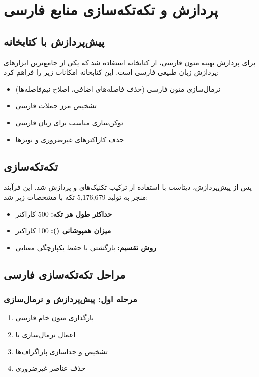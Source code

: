 \documentclass[11pt, a4paper, oneside]{book}
\begin{document}
	\section{پردازش و تکه‌تکه‌سازی منابع فارسی}

	\subsection{پیش‌پردازش با کتابخانه }
	برای پردازش بهینه متون فارسی، از کتابخانه  استفاده شد که یکی از جامع‌ترین ابزارهای پردازش زبان طبیعی فارسی است. این کتابخانه امکانات زیر را فراهم کرد:

	\begin{itemize}
		\item نرمال‌سازی متون فارسی (حذف فاصله‌های اضافی، اصلاح نیم‌فاصله‌ها)
		\item تشخیص مرز جملات فارسی
		\item توکن‌سازی مناسب برای زبان فارسی
		\item حذف کاراکترهای غیرضروری و نویزها
	\end{itemize}

	\subsection{تکه‌تکه‌سازی }
	پس از پیش‌پردازش، دیتاست  با استفاده از ترکیب تکنیک‌های  و  پردازش شد. این فرآیند منجر به تولید 5,176,679 تکه با مشخصات زیر شد:

	\begin{itemize}
		\item \textbf{حداکثر طول هر تکه:} 500 کاراکتر
		\item \textbf{میزان همپوشانی ():} 100 کاراکتر
		\item \textbf{روش تقسیم:} بازگشتی با حفظ یکپارچگی معنایی
	\end{itemize}

	\subsection{مراحل تکه‌تکه‌سازی فارسی}

	\subsubsection{مرحله اول: پیش‌پردازش و نرمال‌سازی}
	\begin{enumerate}
		\item بارگذاری متون خام فارسی
		\item اعمال نرمال‌سازی با 
		\item تشخیص و جداسازی پاراگراف‌ها
		\item حذف عناصر غیرضروری
	\end{enumerate}
\end{document}
